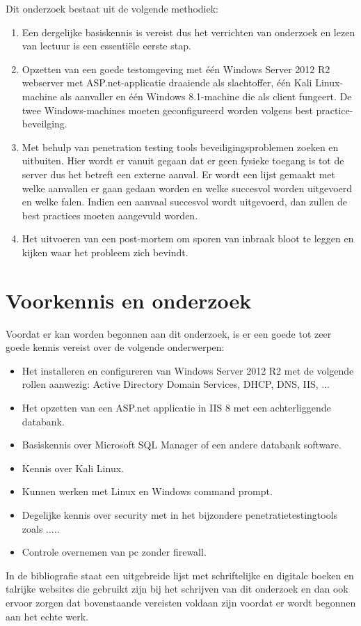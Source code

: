 \documentclass[pdftex,a4paper,12pt]{report}
\begin{document}
Dit onderzoek bestaat uit de volgende methodiek:
\begin{enumerate}
	\item Een dergelijke basiskennis is vereist dus het verrichten van onderzoek en lezen van lectuur is een essentiële eerste stap.
	\item Opzetten van een goede testomgeving met één Windows Server 2012 R2 webserver met ASP.net-applicatie draaiende als slachtoffer, één Kali Linux-machine als aanvaller en één Windows 8.1-machine die als client fungeert. De twee Windows-machines moeten geconfigureerd worden volgens best practice-beveilging.
	\item Met behulp van penetration testing tools beveiligingsproblemen zoeken en uitbuiten. Hier wordt er vanuit gegaan dat er geen fysieke toegang is tot de server dus het betreft een externe aanval. Er wordt een lijst gemaakt met welke aanvallen er gaan gedaan worden en welke succesvol worden uitgevoerd en welke falen. Indien een aanvaal succesvol wordt uitgevoerd, dan zullen de best practices moeten aangevuld worden.
	\item Het uitvoeren van een post-mortem om sporen van inbraak bloot te leggen en kijken waar het probleem zich bevindt.
\end{enumerate}

\section{Voorkennis en onderzoek}
Voordat er kan worden begonnen aan dit onderzoek, is er een goede tot zeer goede kennis vereist over de volgende onderwerpen:
\begin{itemize}
	\item Het installeren en configureren van Windows Server 2012 R2 met de volgende rollen aanwezig: Active Directory Domain Services, DHCP, DNS, IIS, ...
	\item Het opzetten van een ASP.net applicatie in IIS 8 met een achterliggende databank.
	\item Basiskennis over Microsoft SQL Manager of een andere databank software.
	\item Kennis over Kali Linux.
	\item Kunnen werken met Linux en Windows command prompt.
	\item Degelijke kennis over security met in het bijzondere penetratietestingtools zoals ..... 
	\item Controle overnemen van pc zonder firewall.
\end{itemize}
In de bibliografie staat een uitgebreide lijst met schriftelijke en digitale boeken en talrijke websites die gebruikt zijn bij het schrijven van dit onderzoek en dan ook ervoor zorgen dat bovenstaande vereisten voldaan zijn voordat er wordt begonnen aan het echte werk.
\end{document}
